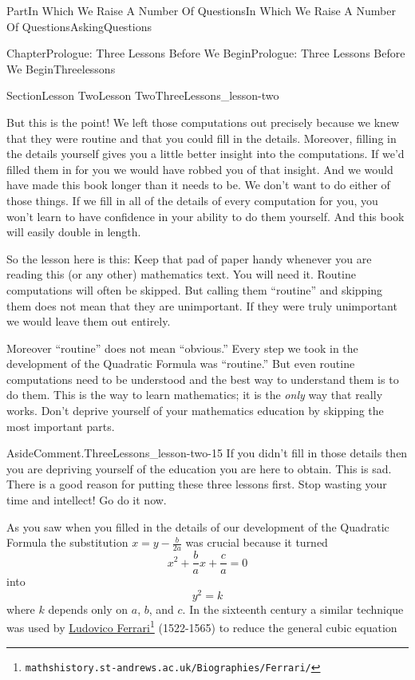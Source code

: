 \documentclass[oneside,10pt,]{book}
\numberwithin{equation}{part}
\begin{document}
\begin{partptx}{Part}{In Which We Raise A Number Of Questions}{}{In Which We Raise A Number Of Questions}{}{}{AskingQuestions}
\begin{chapterptx}{Chapter}{Prologue: Three Lessons Before We Begin}{}{Prologue: Three Lessons Before We Begin}{}{}{Threelessons}
\begin{sectionptx}{Section}{Lesson Two}{}{Lesson Two}{}{}{ThreeLessons_lesson-two}
\par
But this is the point!  We left those computations out precisely because we knew that they were routine and that you could fill in the details.  Moreover, filling in the details yourself gives you a little better insight into the computations.  If we'd filled them in for you we would have robbed you of that insight. And we would have made this book longer than it needs to be.  We don't want to do either of those things.  If we fill in all of the details of every computation for you, you won't learn to have confidence in your ability to do them yourself. And this book will easily double in length.%
\par
So the lesson here is this: Keep that pad of paper handy whenever you are reading this (or any other) mathematics text. You will need it.  Routine computations will often be skipped. But calling them ``routine'' and skipping them does not mean that they are unimportant.  If they were truly unimportant we would leave them out entirely.%
\par
Moreover ``routine'' does not mean ``obvious.'' Every step we took in the development of the Quadratic Formula was ``routine.'' But even routine computations need to be understood and the best way to understand them is to do them. This is the way to learn mathematics; it is the \emph{only} way that really works.  Don't deprive yourself of your mathematics education by skipping the most important parts.%
\begin{aside}{Aside}{Comment.}{ThreeLessons_lesson-two-15}%
If you didn't fill in those details then you are depriving yourself of the education you are here to obtain. This is sad.  There is a good reason for putting these three lessons first.  Stop wasting your time and intellect! Go do it now.%
\end{aside}
As you saw when you filled in the details of our development of the Quadratic Formula the substitution \(x=y-\frac{b}{2a}\) was crucial because it turned%
\begin{equation*}
x^2+\frac{b}{a}x +\frac{c}{a}=0
\end{equation*}
into%
\begin{equation*}
y^2=k
\end{equation*}
where \(k\) depends only on \(a\), \(b\), and \(c\). In the sixteenth century a similar technique was used by \href{https://mathshistory.st-andrews.ac.uk/Biographies/Ferrari/}{Ludovico Ferrari}\footnote{\nolinkurl{mathshistory.st-andrews.ac.uk/Biographies/Ferrari/}\label{ThreeLessons_lesson-two-16-9}} (1522-1565) to reduce the general cubic equation%

\end{sectionptx}
\end{chapterptx}
\end{partptx}
\end{document}
